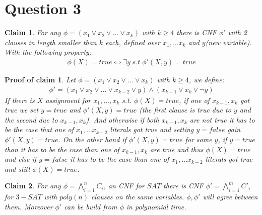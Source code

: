 \documentclass[11pt]{article}
\theoremstyle{plain}
\newtheorem{claim}{Claim}[theorem]
\theoremstyle{nonumberplainnobrackets}
\newtheorem{claimproof}{Proof of claim}
\begin{document}
\section*{Question 3}
\begin{claim}
	For any $\phi = (x_1 \vee x_2 \vee \ldots \vee x_k)$ with $k\ge 4$ there is CNF $\phi'$ with 2 clauses in length smaller than $k$ each, defined over $x_1,\ldots x_k$ and $y$(new variable). With the following property:
	\begin{align*}
	\phi(X) = true \iff \exists y\;s.t\;\phi'(X,y) = true
	\end{align*}
\end{claim}
\begin{claimproof}
	Let $\phi = (x_1 \vee x_2 \vee \ldots \vee x_k)$ with $k\ge 4$, we define:
	\begin{align*}
	\phi' = (x_1 \vee x_2 \vee \ldots \vee x_{k-2} \vee y) \wedge (x_{k-1} \vee x_k  \vee \neg y)
	\end{align*}	
If there is $X$ assignment for $x_1,\ldots,x_k$ s.t. $\phi(X)= true$, if one of $x_{k-1},x_k$ got true we set $y=true$ and $\phi'(X,y) = true$ (the first clause is true due to $y$ and the second due to  $x_{k-1},x_k$). And otherwise if both $x_{k-1},x_k$ are not true it has to be the case that one of $x_1,\ldots x_{k-2}$ literals got true and setting $y=false$ gain $\phi'(X,y) = true$.
On the other hand if $\phi'(X,y) = true$ for some $y$, if $y=true$ than it has to be the case than one of  $x_{k-1},x_k$ are true and thus  $\phi(X)=true$ and else if $y=false$  it has to be the case than one of  $x_1,\ldots x_{k-2}$ literals got true and still $\phi(X)=true$.
\end{claimproof}
\begin{claim}
	For any $\phi=\bigwedge_{i=1}^n C_i$, an CNF for $SAT$ there is CNF $\phi'=\bigwedge_{i=1}^m C'_i$ for $3-SAT$ with $poly(n)$ clauses on the same variables. $\phi,\phi'$ will agree between them. Moreover $\phi'$ can be build from $\phi$ in polynomial time.
\end{claim}
\end{document}

